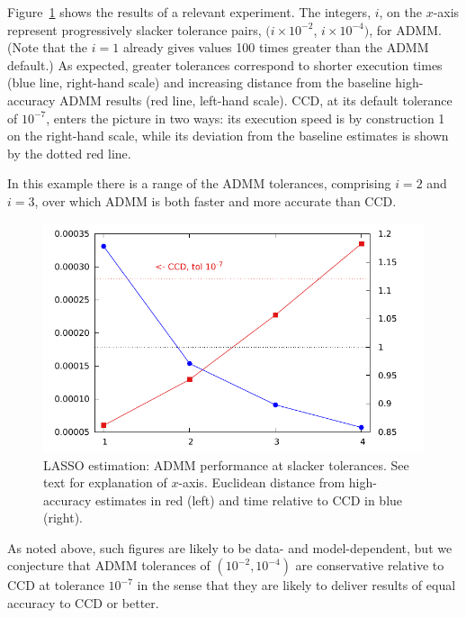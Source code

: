 \documentclass{article}
\begin{document}
Figure~\ref{fig:admm-seq} shows the results of a relevant
experiment. The integers, $i$, on the $x$-axis represent progressively
slacker tolerance pairs, $(i\times 10^{-2}$, $i\times 10^{-4})$, for
ADMM.  (Note that the $i=1$ already gives values 100 times greater
than the ADMM default.) As expected, greater tolerances correspond to
shorter execution times (blue line, right-hand scale) and increasing
distance from the baseline high-accuracy ADMM results (red line,
left-hand scale).  CCD, at its default tolerance of $10^{-7}$, enters
the picture in two ways: its execution speed is by construction 1 on
the right-hand scale, while its deviation from the baseline estimates
is shown by the dotted red line.

In this example there is a range of the ADMM tolerances, comprising
$i=2$ and $i=3$, over which ADMM is both faster and more accurate than
CCD.

\begin{figure}[htbp]
\begin{center}
\includegraphics[scale=0.9]{admm_ccd.pdf}
\caption{LASSO estimation: ADMM performance at slacker tolerances.
  See text for explanation of $x$-axis. Euclidean distance from
  high-accuracy estimates in red (left) and time relative to CCD in
  blue (right).}
\label{fig:admm-seq}
\end{center}
\end{figure}

As noted above, such figures are likely to be data- and
model-dependent, but we conjecture that ADMM tolerances of
$(10^{-2}, 10^{-4})$ are conservative relative to CCD at tolerance
$10^{-7}$ in the sense that they are likely to deliver results of
equal accuracy to CCD or better.
\end{document}
